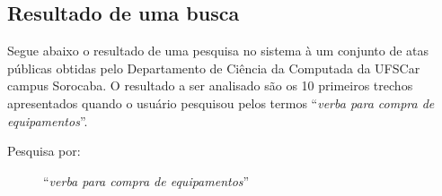 
\newpage


\subsection*{Resultado de uma busca}

Segue abaixo o resultado de uma pesquisa no sistema à um conjunto de atas públicas obtidas pelo Departamento de Ciência da Computada da UFSCar campus Sorocaba. O resultado a ser analisado são os 10 primeiros trechos apresentados quando o usuário pesquisou pelos termos ``\textit{verba para compra de equipamentos}''.

\vspace{0.2 cm}



\begin{description}
\item[Pesquisa por: ] ``\textit{verba para compra de equipamentos}''
\end{description}

